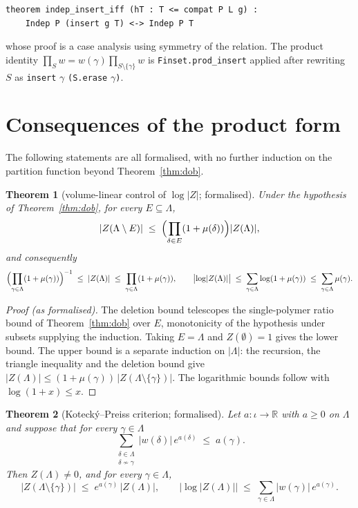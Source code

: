 \documentclass[11pt]{amsart}
\newtheorem{theorem}{Theorem}[section]
\begin{document}
\begin{lstlisting}
theorem indep_insert_iff (hT : T <= compat P L g) :
    Indep P (insert g T) <-> Indep P T
\end{lstlisting}

\noindent
whose proof is a case analysis using symmetry of the relation. The product
identity $\prod_{S} w = w(\gamma)\prod_{S \setminus \{\gamma\}} w$ is
\texttt{Finset.prod\_insert} applied after rewriting $S$ as
\texttt{insert} $\gamma$ \texttt{(S.erase} $\gamma$\texttt{)}.

\section{Consequences of the product form}\label{sec:consequences}

The following statements are all formalised, with no further induction on
the partition function beyond Theorem~\ref{thm:dob}.

\begin{theorem}[volume-linear control of $\log \lvert Z\rvert$;
formalised]\label{thm:log}
Under the hypothesis of Theorem~\ref{thm:dob}, for every $E \subseteq
\Lambda$,
\[
  \lvert Z(\Lambda \setminus E)\rvert \;\le\;
  \Bigl(\prod_{\delta \in E} (1 + \mu(\delta))\Bigr)
  \lvert Z(\Lambda)\rvert,
\]
and consequently
\[
  \Bigl(\prod_{\gamma \in \Lambda} (1 + \mu(\gamma))\Bigr)^{-1}
  \;\le\; \lvert Z(\Lambda)\rvert \;\le\;
  \prod_{\gamma \in \Lambda} (1 + \mu(\gamma)),
  \qquad
  \bigl\lvert \log \lvert Z(\Lambda)\rvert \bigr\rvert \;\le\;
  \sum_{\gamma \in \Lambda} \log (1 + \mu(\gamma))
  \;\le\; \sum_{\gamma \in \Lambda} \mu(\gamma).
\]
\end{theorem}

\begin{proof}[Proof (as formalised)]
The deletion bound telescopes the single-polymer ratio bound of
Theorem~\ref{thm:dob} over $E$, monotonicity of the hypothesis under
subsets supplying the induction. Taking $E = \Lambda$ and $Z(\emptyset)=1$
gives the lower bound. The upper bound is a separate induction on
$\lvert \Lambda \rvert$: the recursion, the triangle inequality and the
deletion bound give $\lvert Z(\Lambda)\rvert \le (1 + \mu(\gamma))\,
\lvert Z(\Lambda \setminus \{\gamma\})\rvert$. The logarithmic bounds
follow with $\log(1+x) \le x$.
\end{proof}

\begin{theorem}[Kotecký--Preiss criterion; formalised]\label{thm:kp}
Let $a \colon \iota \to \mathbb{R}$ with $a \ge 0$ on $\Lambda$ and suppose
that for every $\gamma \in \Lambda$
\[
  \sum_{\substack{\delta \in \Lambda \\ \delta \nsim \gamma}}
  \lvert w(\delta)\rvert \, e^{a(\delta)} \;\le\; a(\gamma).
\]
Then $Z(\Lambda) \neq 0$, and for every $\gamma \in \Lambda$,
\[
  \lvert Z(\Lambda \setminus \{\gamma\})\rvert \;\le\;
  e^{a(\gamma)}\, \lvert Z(\Lambda)\rvert,
  \qquad
  \bigl\lvert \log \lvert Z(\Lambda)\rvert \bigr\rvert \;\le\;
  \sum_{\gamma \in \Lambda} \lvert w(\gamma)\rvert\, e^{a(\gamma)} .
\]
\end{theorem}
\end{document}
